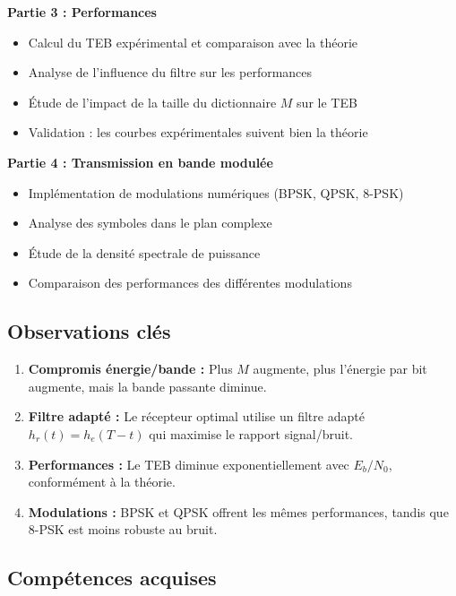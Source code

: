 \documentclass[12pt,a4paper]{article}
\begin{document}
\textbf{Partie 3 : Performances}
\begin{itemize}
    \item Calcul du TEB expérimental et comparaison avec la théorie
    \item Analyse de l'influence du filtre sur les performances
    \item Étude de l'impact de la taille du dictionnaire $M$ sur le TEB
    \item Validation : les courbes expérimentales suivent bien la théorie
\end{itemize}

\textbf{Partie 4 : Transmission en bande modulée}
\begin{itemize}
    \item Implémentation de modulations numériques (BPSK, QPSK, 8-PSK)
    \item Analyse des symboles dans le plan complexe
    \item Étude de la densité spectrale de puissance
    \item Comparaison des performances des différentes modulations
\end{itemize}

\subsection*{Observations clés}

\begin{enumerate}
    \item \textbf{Compromis énergie/bande :} Plus $M$ augmente, plus l'énergie par bit augmente, mais la bande passante diminue.
    
    \item \textbf{Filtre adapté :} Le récepteur optimal utilise un filtre adapté $h_r(t) = h_e(T-t)$ qui maximise le rapport signal/bruit.
    
    \item \textbf{Performances :} Le TEB diminue exponentiellement avec $E_b/N_0$, conformément à la théorie.
    
    \item \textbf{Modulations :} BPSK et QPSK offrent les mêmes performances, tandis que 8-PSK est moins robuste au bruit.
\end{enumerate}

\subsection*{Compétences acquises}
\end{document}
